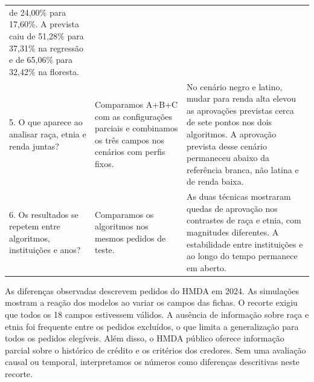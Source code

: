 \documentclass[12pt]{article}
\begin{document}
\begin{longtable}{@{}p{.21\linewidth}p{.27\linewidth}p{.47\linewidth}@{}}
de 24,00\% para 17,60\%. A prevista caiu de 51,28\% para 37,31\%
na regressão e de 65,06\% para 32,42\% na floresta. \\[4pt]
5. O que aparece ao analisar raça, etnia e renda juntas? &
Comparamos A+B+C com as configurações parciais e combinamos os
três campos nos cenários com perfis fixos. &
No cenário negro e latino, mudar para renda alta elevou as
aprovações previstas cerca de sete pontos nos dois algoritmos. A
aprovação prevista desse cenário permaneceu abaixo da referência
branca, não latina e de renda baixa. \\[4pt]
6. Os resultados se repetem entre algoritmos, instituições e anos? &
Comparamos os algoritmos nos mesmos pedidos de teste. &
As duas técnicas mostraram quedas de aprovação nos contrastes de
raça e etnia, com magnitudes diferentes. A estabilidade entre
instituições e ao longo do tempo permanece em aberto. \\
\end{longtable}
\endgroup

As diferenças observadas descrevem pedidos do HMDA em 2024. As
simulações mostram a reação dos modelos ao variar os campos das
fichas. O recorte exigiu que todos os 18 campos estivessem válidos.
A ausência de informação sobre raça e etnia foi frequente entre
os pedidos excluídos, o que limita a generalização para todos os
pedidos elegíveis. Além disso, o HMDA público oferece informação
parcial sobre o histórico de crédito e os critérios dos credores.
Sem uma avaliação causal ou temporal, interpretamos os números
como diferenças descritivas neste recorte.

\begingroup
\makeatletter
\renewcommand{\@biblabel}[1]{}
\makeatother


\endgroup
\end{document}
